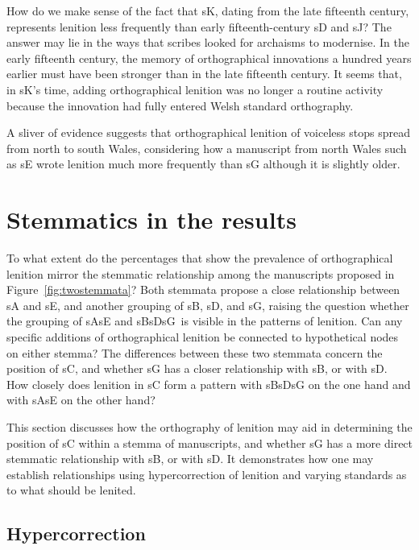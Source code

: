 How do we make sense of the fact that \gls{sK}, dating from the late fifteenth century, represents lenition less frequently than early fifteenth-century \gls{sD} and \gls{sJ}? The answer may lie in the ways that scribes looked for archaisms to modernise. In the early fifteenth century, the memory of orthographical innovations a hundred years earlier must have been stronger than in the late fifteenth century. It seems that, in \gls{sK}'s time, adding orthographical lenition was no longer a routine activity because the innovation had fully entered Welsh standard orthography.

A sliver of evidence suggests that orthographical lenition of voiceless stops spread from north to south Wales, considering how a manuscript from north Wales such as \gls{sE} wrote lenition much more frequently than \gls{sG} although it is slightly older.

\section{Stemmatics in the results}
\label{sec:stemmatics-laws}

To what extent do the percentages that show the prevalence of orthographical lenition mirror the stemmatic relationship among the manuscripts proposed in Figure~\ref{fig:twostemmata}? Both stemmata propose a close relationship between \gls{sA} and \gls{sE}, and another grouping of \gls{sB}, \gls{sD}, and \gls{sG}, raising the question whether the grouping of \gls{sA}\gls{sE} and \gls{sB}\gls{sD}\gls{sG}\ is visible in the patterns of lenition. Can any specific additions of orthographical lenition be connected to hypothetical nodes on either stemma? The differences between these two stemmata concern the position of \gls{sC}, and whether \gls{sG} has a closer relationship with \gls{sB}, or with \gls{sD}. How closely does lenition in \gls{sC} form a pattern with \gls{sB}\gls{sD}\gls{sG} on the one hand and with \gls{sA}\gls{sE} on the other hand?  

This section discusses how the orthography of lenition may aid in determining the position of \gls{sC} within a stemma of manuscripts, and whether \gls{sG} has a more direct stemmatic relationship with \gls{sB}, or with \gls{sD}. It demonstrates how one may establish relationships using hypercorrection of lenition and varying standards as to what should be lenited.

\subsection{Hypercorrection}
\label{sec:hypercorrection}

